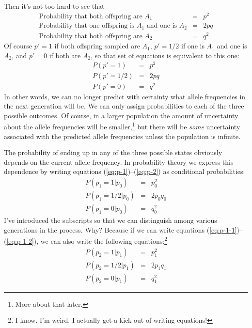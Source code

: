 \noindent Then it's not too hard to see that
\begin{eqnarray*}
\mbox{Probability that both offspring are $A_1$} &=& p^2 \\
\mbox{Probability that one offspring is $A_1$ and one is $A_2$} &=& 2pq \\
\mbox{Probability that both offspring are $A_2$} &=& q^2
\end{eqnarray*}
Of course $p' = 1$ if both offspring sampled are $A_1$, $p' = 1/2$ if
one is $A_1$ and one is $A_2$, and $p' = 0$ if both are $A_2$, so that
set of equations is equivalent to this one:
\begin{eqnarray}
P(p'=1) &=& p^2  \label{eq:p-1} \\
P(p'=1/2) &=& 2pq \\
P(p'=0) &=& q^2  \label{eq:p-2}
\end{eqnarray}
In other words, we can no longer predict with certainty what allele
frequencies in the next generation will be. We can only assign
probabilities to each of the three possible outcomes. Of course, in a
larger population the amount of uncertainty about the allele
frequencies will be smaller,\footnote{More about that later.} but
there will be {\it some\/} uncertainty associated with the predicted
allele frequencies unless the population is infinite.

The probability of ending up in any of the three possible states
obviously depends on the current allele frequency. In probability
theory we express this dependence by writing equations
(\ref{eq:p-1})--(\ref{eq:p-2}) as conditional
probabilities:
\begin{eqnarray}
P(p_1=1|p_0) &=& p_0^2  \label{eq:p-1-1} \\
P(p_1=1/2|p_0) &=& 2p_0q_0 \\
P(p_1=0|p_0) &=& q_0^2  \label{eq:p-1-2}
\end{eqnarray}
I've introduced the subscripts so that we can distinguish among
various generations in the process. Why? Because if we can write
equations (\ref{eq:p-1-1})--(\ref{eq:p-1-2}), we can also write the
following equations:\footnote{I know. I'm weird. I actually get a kick
  out of writing equations!}
\begin{eqnarray*}
P(p_2=1|p_1) &=& p_1^2 \\
P(p_2=1/2|p_1) &=& 2p_1q_1 \\
P(p_2=0|p_1) &=& q_1^2
\end{eqnarray*}

